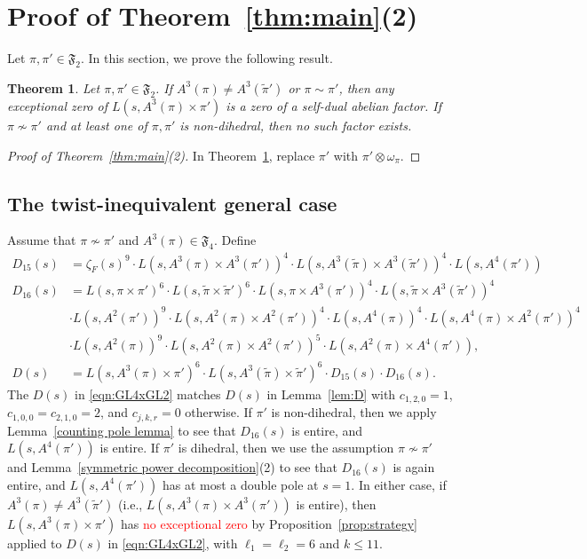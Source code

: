 \documentclass[11pt]{amsart}
\newtheorem{theorem}{Theorem}[section]
\theoremstyle{remark}
\numberwithin{equation}{section}
\begin{document}
\section{Proof of Theorem~\ref{thm:main}(2)}
\label{sec:2}

Let $\pi,\pi'\in\mathfrak{F}_2$.  In this section, we prove the following result.

\begin{theorem}
\label{thm:GL2xGL4}
Let $\pi,\pi'\in\mathfrak{F}_2$.  If $A^3(\pi)\neq A^3(\widetilde{\pi}')$ or $\pi\sim\pi'$, then any exceptional zero of $L(s,A^3(\pi)\times\pi')$ is a zero of a self-dual abelian factor.  If $\pi\not\sim\pi'$ and at least one of $\pi,\pi'$ is non-dihedral, then no such factor exists.
\end{theorem}

\begin{proof}[Proof of Theorem~\ref{thm:main}(2)]
In Theorem~\ref{thm:GL2xGL4}, replace $\pi'$ with $\pi'\otimes\omega_{\pi}$.
\end{proof}

\subsection{The twist-inequivalent general case} Assume that $\pi \not\sim \pi'$ and $A^3(\pi)\in\mathfrak{F}_4$.  Define
\begin{equation}
\label{eqn:GL4xGL2}
\begin{aligned}
    D_{15}(s) &= \zeta_F(s)^9 \cdot L(s,A^3(\pi) \times A^3(\pi'))^4 \cdot L(s,A^3(\widetilde{\pi})\times A^3(\widetilde{\pi}'))^4 \cdot L(s,A^4(\pi'))  \\
    D_{16}(s) &= L(s,\pi \times \pi')^6 \cdot L(s,\widetilde{\pi} \times \widetilde{\pi}')^6 \cdot L(s,\pi \times A^3(\pi'))^4 \cdot L(s,\widetilde\pi \times A^3(\widetilde{\pi}'))^4 \\
    &\cdot L(s,A^2(\pi'))^9 \cdot L(s,A^2(\pi) \times A^2(\pi'))^4 \cdot L(s,A^4(\pi))^4 \cdot L(s,A^4(\pi) \times A^2(\pi'))^4 \\
    &\cdot L(s,A^2(\pi))^9 \cdot L(s,A^2(\pi) \times A^2(\pi'))^5 \cdot L(s,A^2(\pi) \times A^4(\pi')),\\
    D(s)&= L(s,A^3(\pi) \times \pi')^6 \cdot L(s,A^3(\widetilde{\pi})\times \widetilde{\pi}')^6 \cdot D_{15}(s) \cdot D_{16}(s).
\end{aligned}
\end{equation}
The $D(s)$ in \eqref{eqn:GL4xGL2} matches $D(s)$ in Lemma~\ref{lem:D} with $c_{1,2,0} = 1$, $c_{1,0,0} =c_{2,1,0} = 2$, and $c_{j,k,r}=0$ otherwise.  If $\pi'$ is non-dihedral, then we apply Lemma~\ref{counting pole lemma} to see that $D_{16}(s)$ is entire, and $L(s,A^4(\pi'))$ is entire. If $\pi'$ is dihedral, then we use the assumption $\pi \not\sim \pi'$ and Lemma~\ref{symmetric power decomposition}(2) to see that $D_{16}(s)$ is again entire, and $L(s,A^4(\pi'))$ has at most a double pole at $s=1$. In either case, if $A^3(\pi)\neq A^3(\widetilde{\pi}')$ (i.e., $L(s,A^3(\pi) \times A^3(\pi'))$ is entire), then $L(s,A^3(\pi) \times \pi')$ has \textcolor{red}{no exceptional zero} by Proposition~\ref{prop:strategy} applied to $D(s)$ in \eqref{eqn:GL4xGL2}, with $\ell_1 = \ell_2 = 6$ and $k \leq 11$. 
\end{document}
